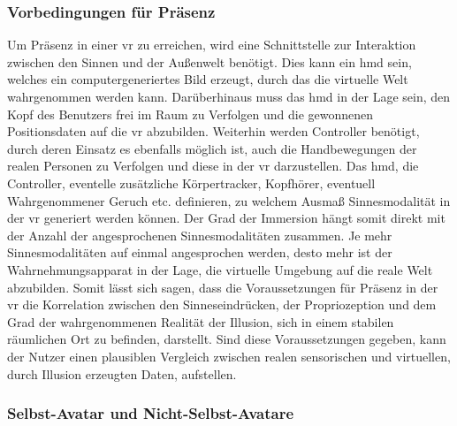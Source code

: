\documentclass[a4paper,11pt]{article}%
\renewcommand{\\}{\vspace*{0.5\baselineskip} \newline}
\begin{document}
\subsubsection{Vorbedingungen für Präsenz}
Um Präsenz in einer \ac{vr} zu erreichen, wird eine Schnittstelle zur Interaktion zwischen den Sinnen und der Außenwelt benötigt. Dies kann ein \ac{hmd} sein, welches ein computergeneriertes Bild erzeugt, durch das die virtuelle Welt wahrgenommen werden kann. Darüberhinaus muss das \ac{hmd} in der Lage sein, den Kopf des Benutzers frei im Raum zu Verfolgen und die gewonnenen Positionsdaten auf die \ac{vr} abzubilden. Weiterhin werden Controller benötigt, durch deren Einsatz es ebenfalls möglich ist, auch die Handbewegungen der realen Personen zu Verfolgen und diese in der \ac{vr} darzustellen. Das \ac{hmd}, die Controller, eventelle zusätzliche Körpertracker, Kopfhörer, eventuell Wahrgenommener Geruch etc. definieren, zu welchem Ausmaß Sinnesmodalität in der \ac{vr} generiert werden können. Der Grad der Immersion hängt somit direkt mit der Anzahl der angesprochenen Sinnesmodalitäten zusammen. Je mehr Sinnesmodalitäten auf einmal angesprochen werden, desto mehr ist der Wahrnehmungsapparat in der Lage, die virtuelle Umgebung auf die reale Welt abzubilden. \\
Somit lässt sich sagen, dass die Voraussetzungen für Präsenz in der \ac{vr} die Korrelation zwischen den Sinneseindrücken, der Propriozeption und dem Grad der wahrgenommenen Realität der Illusion, sich in einem stabilen räumlichen Ort zu befinden, darstellt. Sind diese Voraussetzungen gegeben, kann der Nutzer einen plausiblen Vergleich zwischen realen sensorischen und virtuellen, durch Illusion erzeugten Daten, aufstellen. \citep{slater2009we}

\subsubsection{Selbst-Avatar und Nicht-Selbst-Avatare}
\end{document}
